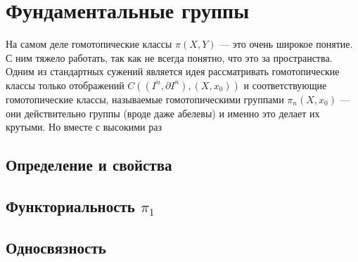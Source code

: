 \section{Фундаментальные группы}
\begin{Intro}
На самом деле гомотопические классы $\pi(X,Y)$ --- это очень широкое понятие. С ним тяжело работать, так как не всегда понятно, что это за пространства. Одним из стандартных сужений является идея рассматривать гомотопические классы только отображений $C\left( (I^n, \partial I^n), (X, x_0)\right)$ и соответствующие гомотопические классы, называемые  гомотопическими группами $\pi_n(X, x_0)$  --- они действительно группы (вроде даже абелевы) и именно это делает их крутыми. Но вместе с высокими раз
\end{Intro}
\subsection{Определение и свойства}
\subsection{Функториальность $\pi_1$ }
\subsection{Односвязность}

